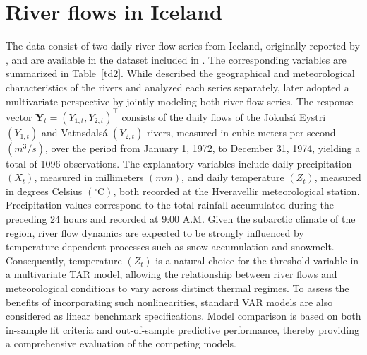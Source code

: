 \section{River flows in Iceland}
The data consist of two daily river flow series from Iceland, originally reported by \cite{T90}, and are available in the  dataset included in . The corresponding variables are summarized in Table~\ref{td2}. While \cite{T90} described the geographical and meteorological characteristics of the rivers and analyzed each series separately, \cite{T98} later adopted a multivariate perspective by jointly modeling both river flow series. The response vector $\bm{Y}_t=(Y_{1,t},Y_{2,t})^{\!\top}$ consists of the daily flows of the Jökulsá Eystri $(Y_{1,t})$ and Vatnsdalsá $(Y_{2,t})$ rivers, measured in cubic meters per second $(m^3/s)$, over the period from January 1, 1972, to December 31, 1974, yielding a total of 1096 observations. The explanatory variables include daily precipitation $(X_t)$, measured in millimeters $(mm)$, and daily temperature $(Z_t)$, measured in degrees Celsius $(^{\circ}\mathrm{C})$, both recorded at the Hveravellir meteorological station. Precipitation values correspond to the total rainfall accumulated during the preceding 24 hours and recorded at 9:00 A.M. Given the subarctic climate of the region, river flow dynamics are expected to be strongly influenced by temperature-dependent processes such as snow accumulation and snowmelt. Consequently, temperature $(Z_t)$ is a natural choice for the threshold variable in a multivariate TAR model, allowing the relationship between river flows and meteorological conditions to vary across distinct thermal regimes. To assess the benefits of incorporating such nonlinearities, standard VAR models are also considered as linear benchmark specifications. Model comparison is based on both in-sample fit criteria and out-of-sample predictive performance, thereby providing a comprehensive evaluation of the competing models.

